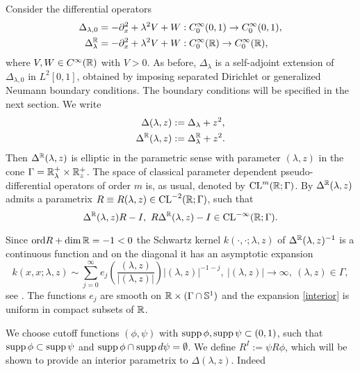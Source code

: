 Consider the differential operators 
\begin{equation}
\begin{split}
\Delta_{\lambda,0}&=-\partial_x^2 + \lambda^2 V +W: C^\infty _0(0,1) \to C^\infty _0(0,1),\\
\Delta^{\mathbb{R}}_\lambda&=-\partial_x^2 + \lambda^2 V +W: C^\infty _0(\mathbb{R}) \to C^\infty _0(\mathbb{R}),
\end{split}
\end{equation}
where $V,W \in C^\infty(\mathbb{R})$ with $V>0$. As before, $\Delta_\lambda$ is a self-adjoint 
extension of $\Delta_{\lambda,0}$ in $L^2[0,1]$, obtained by imposing separated 
Dirichlet or generalized Neumann boundary conditions. The boundary conditions will be specified 
in the next section. We write
\begin{equation}
\begin{split}
\Delta (\lambda, z) &:=\Delta_\lambda + z^2,\\
\Delta^{\mathbb{R}} (\lambda, z)&:=\Delta^{\mathbb{R}}_\lambda +z^2.
\end{split}
\end{equation}
Then $\Delta^{\mathbb{R}}(\lambda,z)$ is elliptic in the parametric sense with parameter $(\lambda,z)$ in the cone 
$\Gamma = \mathbb{R}^+_{\lambda} \times \mathbb{R}^+_{z}$. The space of classical 
parameter dependent pseudo-differential operators of order $m$ is, as usual,
denoted by $\operatorname{CL}^{m}(\mathbb{R};\Gamma)$. By \cite[Sec. II.9]{Shu:POS} 
$\Delta^{\mathbb{R}}(\lambda,z)$ admits a parametrix $R\equiv R(\lambda,z)\in \operatorname{CL}^{-2}(\mathbb{R};\Gamma)$,
such that
$$\Delta^\R(\lambda,z)R-I, \ R\Delta^\R(\lambda,z)-I \in \CL^{-\infty}(\R;\Gamma).$$

Since $\textup{ord}R + \dim \mathbb{R}=-1<0$ the Schwartz kernel 
$k(\cdot, \cdot; \lambda, z)$ of $\Delta^{\mathbb{R}}(\lambda,z)^{-1}$
is a continuous function and on the diagonal it has an asymptotic expansion
\begin{equation}
\label{interior}
k(x,x;\lambda,z)
\sim \sum_{j=0}^\infty e_j \left(\frac{(\lambda,z)}{|(\lambda,z)|}\right)
|(\lambda,z)|^{-1-j}, \ |(\lambda,z)| \to \infty, \ (\lambda,z)\in \Gamma,
\end{equation}
see \cite[Theorem 5.1]{Les:PDO}. The functions $e_j$
are smooth on $\mathbb{R}\times (\Gamma \cap \mathbb{S}^1)$ and the expansion 
\eqref{interior} is uniform in compact subsets of $\mathbb{R}$.

We choose cutoff functions $(\phi,\psi)$ with 
$\textup{supp}\, \phi, \textup{supp}\, \psi \subset (0,1)$,
such that $\textup{supp}\, \phi \subset \textup{supp}\, \psi$ and 
$\textup{supp}\, \phi \cap \textup{supp}\, d\psi=\emptyset$. 
We define $R^I:= \psi R \phi$, which will be shown to 
provide an interior parametrix to $\Delta(\lambda,z)$. 
Indeed 

